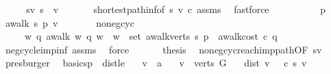 \begin{isabellebody}
%
\isadelimproof
%
\endisadelimproof
%
\isatagproof
{}\isamarkupfalse%
\ {\isacharminus}\isanewline
\ \ \isamarkupfalse%
\ sv{\isacharcolon}\ {\isachardoublequoteopen}s\ {\isasymrightarrow}\isactrlsup {\isacharasterisk}\ v{\isachardoublequoteclose}\ \isanewline
\ \ \ \ \isamarkupfalse%
\ shortest{\isacharunderscore}path{\isacharunderscore}inf{\isacharbrackleft}of\ s\ v\ c{\isacharbrackright}\ assms\ \isamarkupfalse%
\ fastforce\isanewline
\ \ \isacommand{{\isacharbraceleft}}\isamarkupfalse%
\ \isanewline
\ \ \ \ \isamarkupfalse%
\ p\ \isamarkupfalse%
\ {\isachardoublequoteopen}awalk\ s\ p\ v{\isachardoublequoteclose}\isanewline
\ \ \ \ \isamarkupfalse%
\ \isamarkupfalse%
\ no{\isacharunderscore}neg{\isacharunderscore}cyc{\isacharcolon}\ \isanewline
\ \ \ \ {\isachardoublequoteopen}{\isasymnot}\ {\isacharparenleft}{\isasymexists}w\ q{\isachardot}\ awalk\ w\ q\ w\ {\isasymand}\ w\ {\isasymin}\ set\ {\isacharparenleft}awalk{\isacharunderscore}verts\ s\ p{\isacharparenright}\ {\isasymand}\ awalk{\isacharunderscore}cost\ c\ q\ {\isacharless}\ {}{\isacharparenright}{\isachardoublequoteclose}\isanewline
\ \ \ \ \ \ \isamarkupfalse%
\ neg{\isacharunderscore}cycle{\isacharunderscore}imp{\isacharunderscore}inf{\isacharunderscore}{\isasymmu}\ assms\ \isamarkupfalse%
\ force\isanewline
\ \ \isacommand{{\isacharbraceright}}\isamarkupfalse%
\isanewline
\ \ \isamarkupfalse%
\ {\isacharquery}thesis\ \isamarkupfalse%
\ no{\isacharunderscore}neg{\isacharunderscore}cyc{\isacharunderscore}reach{\isacharunderscore}imp{\isacharunderscore}path{\isacharbrackleft}OF\ sv{\isacharbrackright}\ \isamarkupfalse%
\ presburger\isanewline
{}\isamarkupfalse%
%
\endisatagproof
{\isafoldproof}%
%
\isadelimproof
\isanewline
%
\endisadelimproof
\isanewline
{}\isamarkupfalse%
\ {\isacharparenleft}\ basic{\isacharunderscore}sp{\isacharparenright}\ \ dist{\isacharunderscore}le{\isacharunderscore}{\isasymmu}{\isacharcolon}\isanewline
\ \ \ v\ {\isacharcolon}{\isacharcolon}\ {\isacharprime}a\isanewline
\ \ \ {\isachardoublequoteopen}v\ {\isasymin}\ verts\ G{\isachardoublequoteclose}\isanewline
\ \ \ {\isachardoublequoteopen}dist\ v\ {\isasymle}\ {\isasymmu}\ c\ s\ v{\isachardoublequoteclose}\ \isanewline
%
\isadelimproof
%
\endisadelimproof
%
\isatagproof
{}\isamarkupfalse%

\end{isabellebody}

